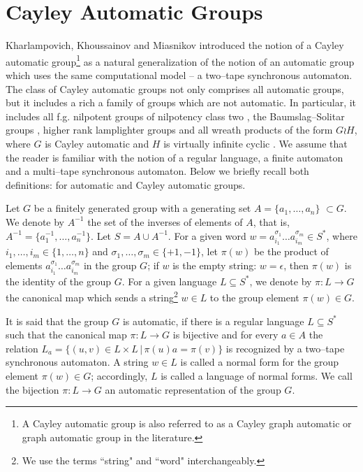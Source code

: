 \documentclass[article,12pt]{elsarticle}
\begin{document}
\section{Cayley Automatic Groups}
\label{Cayley_automatic_section}

Kharlampovich, Khoussainov and Miasnikov 
introduced the notion of a Cayley automatic 
group\footnote{A Cayley automatic group is also referred 
	to as a Cayley graph automatic or graph automatic group
	in the literature.}     
\cite{KKM11} as a natural generalization of
the notion of an automatic group \cite{Epsteinbook} 
which uses the same computational model --  
a two--tape synchronous automaton.   
The class of Cayley automatic groups not only comprises 
all automatic groups, but it includes a rich a family 
of groups which are not automatic. In particular, 
it includes all f.g. nilpotent groups of nilpotency class two \cite{KKM11}, 
the Baumslag--Solitar groups \cite{dlt14},  
higher rank lamplighter groups \cite{Taback18} and 
all wreath products of the form $G \wr H$, where 
$G$ is Cayley automatic and $H$ is virtually 
infinite cyclic
\cite{BET19}. We assume that the reader is 
familiar with the notion of a regular language, 
a finite automaton and a multi--tape synchronous 
automaton. Below we briefly recall both 
definitions: for automatic and Cayley automatic groups.  

Let $G$ be a finitely generated   group 
with a generating set 
$A = \{a_1, \dots, a_n\}$ $\subset G$. 
We denote by $A^{-1}$ the set of the inverses  
of elements of $A$, that is, 
$A^{-1} = \{a_1 ^{-1}, \dots, a_n ^{-1}\} $. 
Let $S = A \cup A^{-1}$. 
For a given word 
$w = a_{i_1}^{\sigma_1} \dots a_{i_m}^{\sigma_m} \in S^*$,  
where $i_1,\dots, i_m \in \{1,\dots,n\}$ and 
$\sigma_1, \dots, \sigma_m  \in \{+1,-1\}$, 
let $\pi (w)$ be  the product of elements 
$a_{i_1}^{\sigma_1} \dots a_{i_m}^{\sigma_m}$
in the group $G$; if $w$ is the empty string: $w = \epsilon$, then 
$\pi(w)$ is the identity of the group $G$. 
For a given language $L \subseteq S^*$, we denote 
by $\pi : L \rightarrow G$ the canonical map
which sends a string\footnote{We use the terms ``string" and ``word" interchangeably.}  
$w \in L$ to the group element $\pi(w) \in G$.  

It is said that the group $G$ is automatic, if there is a 
regular language $L \subseteq S^*$ such that 
the canonical map $\pi : L \rightarrow G$ 
is bijective and for every $a \in A$ the relation 
$L_a = \{(u,v) \in L \times L \, | \, 
\pi(u)a = \pi(v)\}$ is recognized by a two--tape
synchronous automaton. 
A string $w \in L$ is called a normal form 
for the group element $\pi (w) \in G$;  
accordingly, $L$ is called a language of normal 
forms. We call the bijection $\pi : L \rightarrow G$
an automatic representation of the group $G$. 
\end{document}
